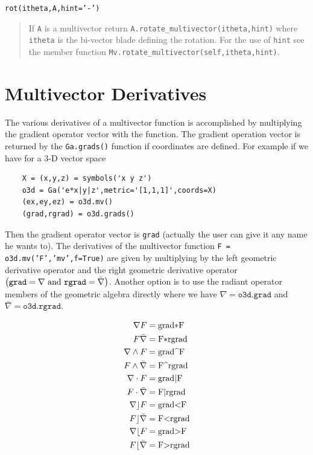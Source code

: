\documentclass[12pt]{report}
\newcommand{\lp}{\left (}
\newcommand{\rp}{\right )}
\newcommand{\W}{\wedge}
\newcommand{\paren}[1]{\lp {#1} \rp}
\newcommand{\T}[1]{\texttt{#1}}
\begin{document}
\T{rot(itheta,A,hint='-')}
\begin{quote}
    If \T{A} is a multivector return \T{A.rotate\_multivector(itheta,hint)} where \T{itheta} is the bi-vector blade defining the rotation.
    For the use of \T{hint} see the member function \T{Mv.rotate\_multivector(self,itheta,hint)}.

\end{quote}

\section{Multivector Derivatives}\label{makeMVD}

The various derivatives of a multivector function is accomplished by
multiplying the gradient operator vector with the function.  The gradient
operation vector is returned by the \T{Ga.grads()} function if coordinates
are defined.  For example if we have for a 3-D vector space

\begin{lstlisting}
    X = (x,y,z) = symbols('x y z')
    o3d = Ga('e*x|y|z',metric='[1,1,1]',coords=X)
    (ex,ey,ez) = o3d.mv()
    (grad,rgrad) = o3d.grads()
\end{lstlisting}

Then the gradient operator vector is \T{grad} (actually the user can give
it any name he wants to).  The derivatives of the multivector
function \T{F = o3d.mv('F','mv',f=True)} are given by multiplying by the
left geometric derivative operator and the right geometric derivative operator
$\paren{\mbox{\T{grad}} = \nabla\mbox{ and } \mbox{\T{rgrad}} = \bar{\nabla}}$.  Another option
is to use the radiant operator members of the geometric algebra directly where we have
$\nabla = \T{o3d.grad}$ and $\bar{\nabla} = \T{o3d.rgrad}$.

      \begin{align*}
            \nabla F &=  \mbox{\lstinline!grad*F!} \\
            F \bar{\nabla} &=  \mbox{\lstinline!F*rgrad!} \\
            \nabla \W F &=  \mbox{\lstinline!grad^F!} \\
            F \W \bar{\nabla} &=  \mbox{\lstinline!F^rgrad!} \\
            \nabla \cdot F &=  \mbox{\lstinline!grad|F!} \\
            F \cdot \bar{\nabla} &=  \mbox{\lstinline!F|rgrad!} \\
            \nabla \rfloor F &=  \mbox{\lstinline!grad<F!} \\
            F \rfloor \bar{\nabla} &=  \mbox{\lstinline!F<rgrad!} \\
            \nabla \lfloor F &=  \mbox{\lstinline!grad>F!} \\
            F \lfloor \bar{\nabla} &= \mbox{\lstinline!F>rgrad!}
      \end{align*}
\end{document}
